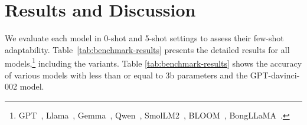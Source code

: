 






\section{Results and Discussion}
\label{sec:results}

We evaluate each model in 0-shot and 5-shot settings to assess their few-shot adaptability. Table~\ref{tab:benchmark-results} presents the detailed results for all models,\footnote{GPT~\cite{openai2023gpt4}, Llama~\cite{touvron2023llama}, Gemma~\cite{team2024gemma}, Qwen~\cite{chu2024qwen2}, SmolLM2~\cite{allal2025smollm2}, BLOOM~\cite{le2023bloom}, BongLLaMA~\cite{zehady2024bongllama}.} including the \titu{} variants. Table \ref{tab:benchmark-results} shows the accuracy of various models with less than or equal to 3b parameters and the GPT-davinci-002 model.


